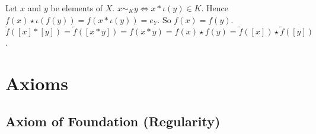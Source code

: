 \documentclass{book}
\numberwithin{equation}{section}
\begin{document}
\begin{proofenv}
    Let $x$ and $y$ be elements of $X$. $x\sim_K y\Leftrightarrow x*\iota(y)\in K$. Hence $f(x)\star \iota(f(y))=f(x*\iota(y))=e_Y$. So $f(x)=f(y)$. $\tilde{f}([x]*[y])=\tilde{f}([x*y])=f(x*y)=f(x)\star f(y)=\tilde{f}([x])\star \tilde{f}([y])$.
\end{proofenv}









\appendix












\chapter{Axioms}

\section{Axiom of Foundation (Regularity)}
\end{document}
